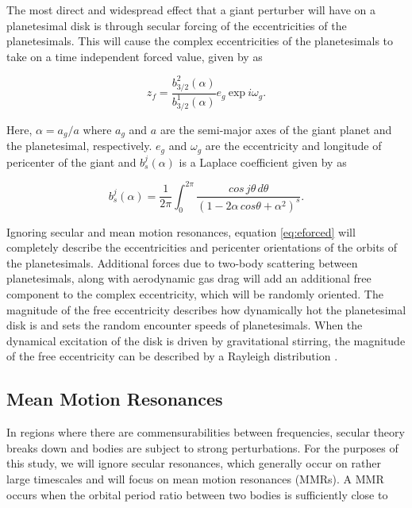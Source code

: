 \documentclass[twocolumn]{aastex62}
\begin{document}
The most direct and widespread effect that a giant perturber will have on a planetesimal disk is through secular forcing of the eccentricities of the planetesimals. This will cause the complex eccentricities of the planetesimals to take on a time independent forced value, given by \citep{1999ApJ...527..918W} as

\begin{equation}\label{eq:eforced}
	z_{f} = \frac{b^{2}_{3/2} (\alpha)}{b^{1}_{3/2} (\alpha)} e_{g} ~ \mathrm{exp} ~ i \omega_{g}.
\end{equation}

\noindent Here, $\alpha = a_{g} / a$ where $a_{g}$ and $a$ are the semi-major axes of the giant planet and the planetesimal, respectively. $e_{g}$ and $\omega_{g}$ are the eccentricity and longitude of pericenter of the giant and $b^{j}_{s} (\alpha)$ is a Laplace coefficient given by \citep{2000ssd..book.....M} as

\begin{equation}\label{eq:lap}
	b_{s}^{j}(\alpha) = \frac{1}{2 \pi} \int_{0}^{2 \pi} \frac{cos \, j \theta \, d \theta}{\left( 1 - 2 \alpha \, cos \theta + \alpha^2 \right)^{s}}.
\end{equation}

Ignoring secular and mean motion resonances, equation \ref{eq:eforced} will completely describe the eccentricities and pericenter orientations of the orbits of the planetesimals. Additional forces due to two-body scattering between planetesimals, along with aerodynamic gas drag will add an additional free component to the complex eccentricity, which will be randomly oriented. The magnitude of the free eccentricity describes how dynamically hot the planetesimal disk is and sets the random encounter speeds of planetesimals. When the dynamical excitation of the disk is driven by gravitational stirring, the magnitude of the free eccentricity can be described by a Rayleigh distribution \citep{1992Icar...96..107I}.

\subsection{Mean Motion Resonances}

In regions where there are commensurabilities between frequencies, secular theory breaks down and bodies are subject to strong perturbations. For the purposes of this study, we will ignore secular resonances, which generally occur on rather large timescales and will focus on mean motion resonances (MMRs). A MMR occurs  when the orbital period ratio between two bodies is sufficiently close to
\end{document}
